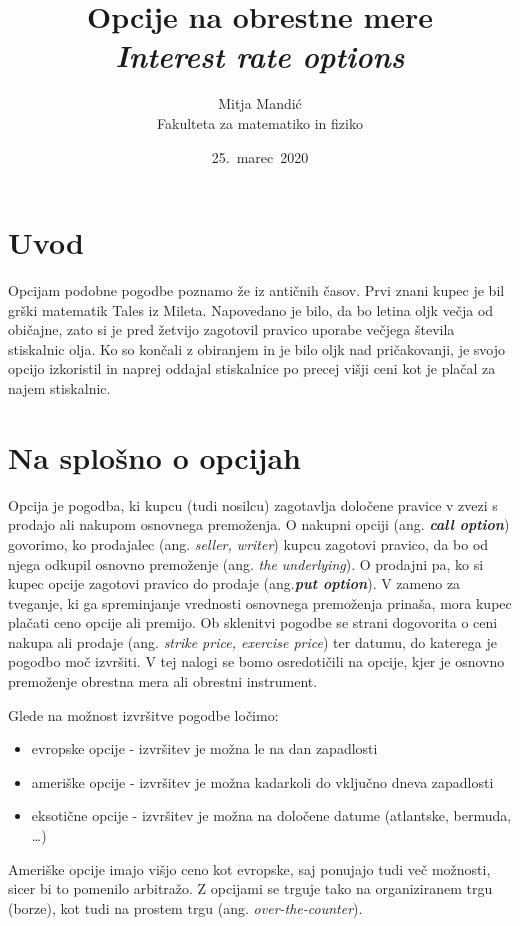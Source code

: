 \documentclass[a4paper]{article}
\title{Opcije na obrestne mere\\
    \textit{Interest rate options}}
\author{Mitja Mandić \\ Fakulteta za matematiko in fiziko}
\date{25.\ marec\ 2020}
\begin{document}
\begin{titlepage}
    \maketitle
    \thispagestyle{empty}
\end{titlepage}

\pagebreak
\tableofcontents
\pagebreak

\section{Uvod}
Opcijam podobne pogodbe poznamo že iz antičnih časov. Prvi znani kupec je bil grški matematik Tales iz Mileta.
Napovedano je bilo, da bo letina oljk večja od običajne, zato si je pred žetvijo zagotovil pravico uporabe večjega
števila stiskalnic olja. Ko so končali z obiranjem in je bilo oljk nad pričakovanji, je svojo opcijo izkoristil in naprej oddajal
stiskalnice po precej višji ceni kot je plačal za najem stiskalnic.

\section{Na splošno o opcijah}

Opcija je pogodba, ki kupcu (tudi nosilcu) zagotavlja določene pravice v zvezi s prodajo ali nakupom osnovnega premoženja.
O nakupni opciji (ang. \textbf{\textit{call option}}) govorimo, ko prodajalec (ang. \textit{seller, writer}) kupcu zagotovi pravico,
da bo od njega odkupil osnovno premoženje (ang. \textit{the underlying}). O prodajni pa, ko si kupec opcije zagotovi 
pravico do prodaje (ang.\textit{\textbf{put option}}).
V zameno za tveganje, ki ga spreminjanje vrednosti osnovnega premoženja prinaša, 
mora kupec plačati ceno opcije ali premijo. Ob sklenitvi pogodbe se strani dogovorita o ceni nakupa ali prodaje
(ang. \textit{strike price, exercise price}) ter datumu, do katerega je pogodbo moč izvršiti.
V tej nalogi se bomo osredotičili na opcije, kjer je osnovno premoženje obrestna mera ali obrestni instrument. 

Glede na možnost izvršitve pogodbe ločimo:
\begin{itemize}
    \item evropske opcije - izvršitev je možna le na dan zapadlosti
    \item ameriške opcije - izvršitev je možna kadarkoli do vključno dneva zapadlosti
    \item eksotične opcije - izvršitev je možna na določene datume (atlantske, bermuda, \ldots)
\end{itemize}
Ameriške opcije imajo višjo ceno kot evropske, saj ponujajo tudi več možnosti, sicer bi to pomenilo arbitražo.
Z opcijami se trguje tako na organiziranem trgu (borze), kot tudi na prostem trgu (ang. \textit{over-the-counter}).
\end{document}
